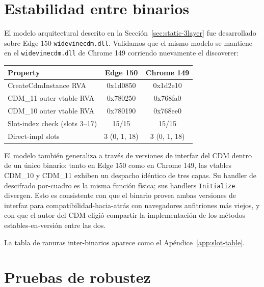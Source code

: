 \documentclass[11pt,letterpaper]{article}
\let\oldsection\section
\renewcommand{\section}{\clearpage\oldsection}
\begin{document}
\section{Estabilidad entre binarios}
\label{sec:cross}

El modelo arquitectural descrito en la
Sección~\ref{sec:static-3layer} fue desarrollado sobre Edge 150
\texttt{widevinecdm.dll}. Validamos que el mismo modelo se
mantiene en el \texttt{widevinecdm.dll} de Chrome 149 corriendo
nuevamente el discoverer:

\begin{center}\small
\begin{tabular}{lcc}
\toprule
\textbf{Property} & \textbf{Edge 150} & \textbf{Chrome 149} \\
\midrule
CreateCdmInstance RVA          & 0x1d0850 & 0x1d2e10 \\
CDM\_11 outer vtable RVA       & 0x780250 & 0x768fa0 \\
CDM\_10 outer vtable RVA       & 0x780190 & 0x768ee0 \\
Slot-index check (slots 3--17) & 15/15    & 15/15    \\
Direct-impl slots              & 3 (0, 1, 18) & 3 (0, 1, 18) \\
\bottomrule
\end{tabular}
\end{center}

\noindent El modelo también generaliza a través de versiones de
interfaz del CDM dentro de un único binario: tanto en Edge 150
como en Chrome 149, las vtables CDM\_10 y CDM\_11 exhiben un
despacho idéntico de tres capas. Su handler de descifrado
por-cuadro es la misma función física; sus handlers
\texttt{Initialize} divergen. Esto es consistente con que el
binario provea ambas versiones de interfaz para
compatibilidad-hacia-atrás con navegadores anfitriones más
viejos, y con que el autor del CDM eligió compartir la
implementación de los métodos estables-en-versión entre las dos.

La tabla de ranuras inter-binarios aparece como el
Apéndice~\ref{app:slot-table}.

\section{Pruebas de robustez}
\label{sec:robustness}
\end{document}
